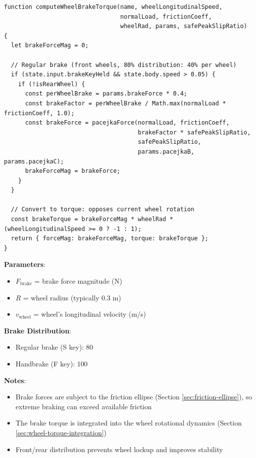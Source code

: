 \begin{lstlisting}[caption={Brake torque computation}]
function computeWheelBrakeTorque(name, wheelLongitudinalSpeed,
                                 normalLoad, frictionCoeff,
                                 wheelRad, params, safePeakSlipRatio) {
  let brakeForceMag = 0;

  // Regular brake (front wheels, 80% distribution: 40% per wheel)
  if (state.input.brakeKeyHeld && state.body.speed > 0.05) {
    if (!isRearWheel) {
      const perWheelBrake = params.brakeForce * 0.4;
      const brakeFactor = perWheelBrake / Math.max(normalLoad * frictionCoeff, 1.0);
      const brakeForce = pacejkaForce(normalLoad, frictionCoeff,
                                      brakeFactor * safePeakSlipRatio,
                                      safePeakSlipRatio,
                                      params.pacejkaB, params.pacejkaC);
      brakeForceMag = brakeForce;
    }
  }

  // Convert to torque: opposes current wheel rotation
  const brakeTorque = brakeForceMag * wheelRad * (wheelLongitudinalSpeed >= 0 ? -1 : 1);
  return { forceMag: brakeForceMag, torque: brakeTorque };
}
\end{lstlisting}

\textbf{Parameters}:
\begin{itemize}
  \item $F_{\text{brake}}$ = brake force magnitude (N)
  \item $R$ = wheel radius (typically 0.3 m)
  \item $v_{\text{wheel}}$ = wheel's longitudinal velocity (m/s)
\end{itemize}

\textbf{Brake Distribution}:
\begin{itemize}
  \item Regular brake (S key): 80%
  \item Handbrake (F key): 100%
\end{itemize}

\textbf{Notes}:
\begin{itemize}
  \item Brake forces are subject to the friction ellipse (Section \ref{sec:friction-ellipse}), so extreme braking can exceed available friction
  \item The brake torque is integrated into the wheel rotational dynamics (Section \ref{sec:wheel-torque-integration})
  \item Front/rear distribution prevents wheel lockup and improves stability
\end{itemize}

